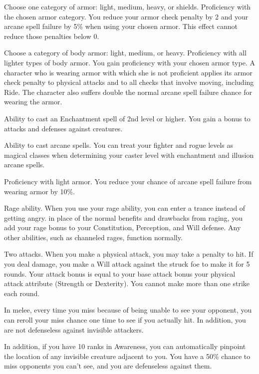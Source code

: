 Choose one category of armor: light, medium, heavy, or shields.
\featpre Proficiency with the chosen armor category.
\featben You reduce your armor check penalty by 2 and your arcane spell failure by 5\% when using your chosen armor.
This effect cannot reduce those penalties below 0.

Choose a category of body armor: light, medium, or heavy.
\featpre Proficiency with all lighter types of body armor.
\featben You gain proficiency with your chosen armor type.
A character who is wearing armor with which she is not proficient applies its armor check penalty to physical attacks and to all checks that involve moving, including Ride.
The character also suffers double the normal arcane spell failure chance for wearing the armor.

\featpre Ability to cast an Enchantment spell of 2nd level or higher.
\featben You gain a  bonus to attacks and defenses against \bewildered creatures.
\featspecial \featbanenotes

\featpre Ability to cast arcane spells.
\featben You can treat your fighter and rogue levels as magical classes when determining your caster level with enchantment and illusion arcane spells.

\featpre Proficiency with light armor.
\featben You reduce your chance of arcane spell failure from wearing armor by 10\%.

\featpre Rage ability.
\featben When you use your rage ability, you can enter a trance instead of getting angry.
in place of the normal benefits and drawbacks from raging, you add your rage bonus to your Constitution, Perception, and Will defense.
Any other abilities, such as channeled rages, function normally.

\featpre Two attacks.
\featben When you make a physical attack, you may take a  penalty to hit.
If you deal damage, you make a Will attack against the struck foe to make it \bewildered for 5 rounds.
Your attack bonus is equal to your base attack bonus \add your physical attack attribute (Strength or Dexterity).
You cannot make more than one strike each round.

\featben In melee, every time you miss because of being unable to see your opponent, you can reroll your miss chance one time to see if you actually hit.
In addition, you are not defenseless against invisible attackers.
\par In addition, if you have 10 ranks in Awareness, you can automatically pinpoint the location of any invisible creature adjacent to you.
You have a 50\% chance to miss opponents you can't see, and you are defenseless against them.

